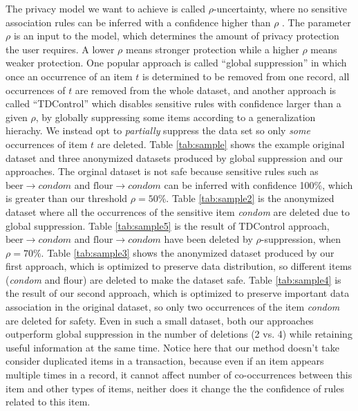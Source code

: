 The privacy model we want to achieve is called $\rho$-uncertainty, where
no sensitive association rules can be inferred with a confidence higher than
$\rho$ \cite{Cao:2010:rho}. The parameter $\rho$ is an input to the model,
which determines the amount of privacy protection the user requires. 
A lower $\rho$ means stronger protection while a higher $\rho$ means weaker
protection. 
%
One popular approach is called ``global suppression'' in which once an occurrence of an item $t$ is determined to be removed from one record, all occurrences of $t$ are removed from the whole dataset, and another approach is called 
``TDControl'' \cite{Cao:2010:rho} which disables sensitive rules with confidence 
larger than a given $\rho$, by globally suppressing some items according to
a generalization hierachy. We instead opt to {\em partially} suppress the data set so only {\em some} occurrences of item $t$ are deleted. Table \ref{tab:sample} shows the example original dataset
and three anonymized datasets produced by global suppression and our approaches.
The orginal dataset is not safe because sensitive rules such as
$\text{beer} \rightarrow condom$ and $\text{flour} \rightarrow condom$
can be inferred with confidence 100\%, which is greater than our threshold $\rho=50\%$.
Table \ref{tab:sample2} is the anonymized dataset where all the occurrences of the sensitive item {\em condom} are deleted due to global suppression. Table \ref{tab:sample5} is the result of TDControl approach, $\text{beer} \rightarrow condom$ and $\text{flour} \rightarrow condom$ have been deleted by $\rho$-suppression, when $\rho=70\%$.
Table \ref{tab:sample3} shows the anonymized dataset produced by our first
approach, which is optimized to preserve data distribution, so different
items ({\em condom} and flour) are deleted to make the dataset safe.
Table \ref{tab:sample4} is the result of our second approach, which is optimized
to preserve important data association in the original dataset, so only
two occurrences of the item {\em condom} are deleted for safety.
Even in such a small dataset, both our approaches outperform global suppression
in the number of deletions (2 vs. 4) while retaining useful information at the same time.
Notice here that our method doesn't take consider duplicated items in a transaction,
because even if an item appears multiple times in a record, it cannot affect number of co-occurrences
between this item and other types of items, neither does it change the 
the confidence of rules related to this item. 

